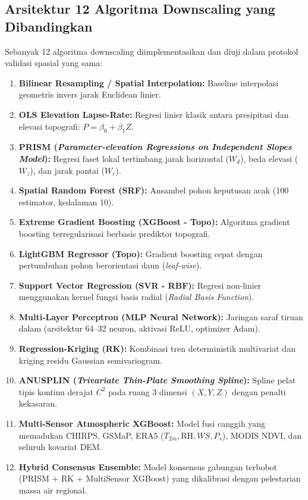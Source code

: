\documentclass[11pt,a4paper,titlepage]{article}
\begin{document}
\subsection{Arsitektur 12 Algoritma Downscaling yang Dibandingkan}
Sebanyak 12 algoritma downscaling diimplementasikan dan diuji dalam protokol validasi spasial yang sama:
\begin{enumerate}
    \item \textbf{Bilinear Resampling / Spatial Interpolation:} Baseline interpolasi geometris invers jarak Euclidean linier.
    \item \textbf{OLS Elevation Lapse-Rate:} Regresi linier klasik antara presipitasi dan elevasi topografi: $P = \beta_0 + \beta_1 Z$.
    \item \textbf{PRISM (\textit{Parameter-elevation Regressions on Independent Slopes Model}):} Regresi faset lokal tertimbang jarak horizontal ($W_d$), beda elevasi ($W_z$), dan jarak pantai ($W_c$).
    \item \textbf{Spatial Random Forest (SRF):} Ansambel pohon keputusan acak (100 estimator, kedalaman 10).
    \item \textbf{Extreme Gradient Boosting (XGBoost - Topo):} Algoritma gradient boosting terregularisasi berbasis prediktor topografi.
    \item \textbf{LightGBM Regressor (Topo):} Gradient boosting cepat dengan pertumbuhan pohon berorientasi daun (\textit{leaf-wise}).
    \item \textbf{Support Vector Regression (SVR - RBF):} Regresi non-linier menggunakan kernel fungsi basis radial (\textit{Radial Basis Function}).
    \item \textbf{Multi-Layer Perceptron (MLP Neural Network):} Jaringan saraf tiruan dalam (arsitektur 64--32 neuron, aktivasi ReLU, optimizer Adam).
    \item \textbf{Regression-Kriging (RK):} Kombinasi tren deterministik multivariat dan kriging residu Gaussian semivariogram.
    \item \textbf{ANUSPLIN (\textit{Trivariate Thin-Plate Smoothing Spline}):} Spline pelat tipis kontinu derajat $C^2$ pada ruang 3 dimensi $(X, Y, Z)$ dengan penalti kekasaran.
    \item \textbf{Multi-Sensor Atmospheric XGBoost:} Model fusi canggih yang memadukan CHIRPS, GSMaP, ERA5 ($T_{2m}, \text{RH}, WS, P_s$), MODIS NDVI, dan seluruh kovariat DEM.
    \item \textbf{Hybrid Consensus Ensemble:} Model konsensus gabungan terbobot (PRISM + RK + MultiSensor XGBoost) yang dikalibrasi dengan pelestarian massa air regional.
\end{enumerate}
\end{document}

